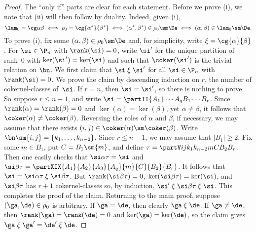 \begin{proof} The ``only if'' parts are clear for each statement.
%
Before we prove (i), we note that (ii) will then follow by duality.  Indeed, given (i),
\[
\lam_0=\cg\alpha\beta \iff \rho_0=\cg{\alpha^*}{\beta^*} \iff (\alpha^*,\beta^*)\in\rho_0\sm\De \iff (\alpha,\beta)\in\lam_0\sm\De.
\]
To prove (i), 
fix some $(\alpha,\beta)\in\rho_0\sm\De$ and, for simplicity, write ${\mathrel\xi}=\cg{\alpha}{\beta}$.  For $\si\in\P_n$ with $\rank(\si)=0$, write $\si'$ for the unique partition of rank~$0$ with $\ker(\si')=\ker(\si)$ and such that $\coker(\si')$ is the trivial relation on $\bn$.  
%
We first claim that $\si\mathrel\xi\si'$ for all $\si\in\P_n$ with $\rank(\si)=0$.  We prove the claim by descending induction on $r$, the number of cokernel-classes of~$\si$.  If $r=n$, then $\si=\si'$, so there is nothing to prove.  So suppose
$r\leq n-1$, and write $\si=\partII{A_1}\cdots{A_q}{B_1}\cdots{B_r}$.
%
Since $\rank(\alpha)=\rank(\beta)=0$ and $\ker(\alpha)=\ker(\beta)$, yet $\alpha\not=\beta$, it follows that $\coker(\alpha)\not=\coker(\beta)$.  Reversing the roles of $\alpha$ and $\beta$, if necessary, we may assume that there exists $(i,j)\in\coker(\alpha)\sm\coker(\beta)$.  
Write $\bn\sm\{i,j\}=\{k_1,\ldots,k_{n-2}\}$.
%
Since $r\leq n-1$, we may assume that $|B_1|\geq2$.  Fix some $m\in B_1$, put $C=B_1\sm\{m\}$, and define $\tau=\partV ij{k_1}{k_{n-2}}{m}{C}{B_2}{B_r}$.
%
Then one easily checks that $\si\alpha\tau = \si$ and $\si\beta\tau = \partXIX{A_1}{A_2}{A_3}{A_q}{m}{C}{B_2}{B_r}$.  It follows that $\si=\si\alpha\tau\mathrel\xi\si\beta\tau$.  But $\rank(\si\beta\tau)=0$, $\ker(\si\beta\tau)=\ker(\si)$, and $\si\beta\tau$ has $r+1$ cokernel-classes so, by induction, $\si'\mathrel\xi\si\beta\tau\mathrel\xi\si$.  This completes the proof of the claim.  
%
Returning to the main proof, suppose $(\ga,\de)\in\rho_0$ is arbitrary.  If $\ga=\de$, then clearly $\ga\mathrel\xi\de$.  If $\ga\not=\de$, then $\rank(\ga)=\rank(\de)=0$ and $\ker(\ga)=\ker(\de)$, so the claim gives $\ga\mathrel\xi\ga'=\de'\mathrel\xi\de$. 


\end{proof}
